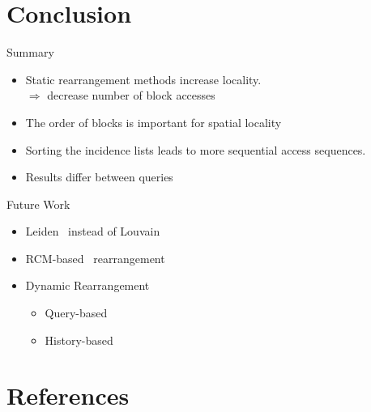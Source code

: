 \documentclass[rgb]{beamer}
\begin{document}
    \section{Conclusion}
        \begin{frame}{Summary}
            \begin{itemize}
                \item Static rearrangement methods increase locality. \\ [0.5em]
                $\Rightarrow$ decrease number of block accesses \\ [3em]
                \item The order of blocks is important for spatial locality \\ [3em]
                \item Sorting the incidence lists leads to more sequential access sequences. \\ [3em]
                \item Results differ between queries 
                \end{itemize}
        \end{frame}
    
        \begin{frame}{Future Work}
        \begin{itemize}
            \item Leiden~\autocite{traag2019louvain} instead of Louvain \\ [2em]
            \item RCM-based~\autocite{Cuthill1969ReducingTB} rearrangement \\ [2em]
            \item  Dynamic Rearrangement \\ [1.5em]
                \begin{itemize}
                 \item Query-based \\ [1em]
                 \item History-based 
                \end{itemize}

        \end{itemize}
        \end{frame}
        
\section{References}
    \begin{frame}[allowframebreaks]
    \nocite{*}
      \begin{tiny}
      \printbibliography
      \end{tiny}
    \end{frame}
\end{document}
